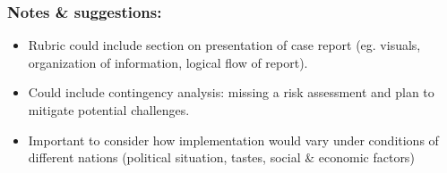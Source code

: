 \documentclass[
  11pt,
]{article}
\providecommand{\tightlist}{%
  \setlength{\itemsep}{0pt}\setlength{\parskip}{0pt}}
\begin{document}
\subsubsection{Notes \& suggestions:}\label{notes-suggestions}

\begin{itemize}
\tightlist
\item
  Rubric could include section on presentation of case report (eg.
  visuals, organization of information, logical flow of report).
\item
  Could include contingency analysis: missing a risk assessment and plan
  to mitigate potential challenges.
\item
  Important to consider how implementation would vary under conditions
  of different nations (political situation, tastes, social \& economic
  factors)
\end{itemize}


\printbibliography
\end{document}

